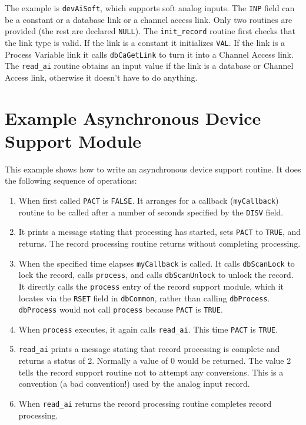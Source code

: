 The example is \verb|devAiSoft|, which supports soft analog inputs.
The \verb|INP| field can be a constant or a database link or a channel access link.
Only two routines are provided (the rest are declared \verb|NULL|).
The \verb|init_record| routine first checks that the link type is valid.
If the link is a constant it initializes \verb|VAL|.
If the link is a Process Variable link it calls \verb|dbCaGetLink| to turn it into a Channel Access link.
The \verb|read_ai| routine obtains an input value if the link is a database 
or Channel Access link, otherwise it doesn't have to do anything.  

\section{Example Asynchronous Device Support Module}

This example shows how to write an asynchronous device support routine.
It does the following sequence of operations:

\begin{enumerate}
\item When first called \verb|PACT| is \verb|FALSE|.
It arranges for a callback (\verb|myCallback|) routine to be called after a number of seconds specified by the \verb|DISV| field.

\item It prints a message stating that processing has started, sets \verb|PACT| to \verb|TRUE|, and returns.
The record processing routine returns without completing processing.

\item When the specified time elapses \verb|myCallback| is called.
It calls \verb|dbScanLock| to lock the record, calls \verb|process|, and calls \verb|dbScanUnlock| to unlock the record.
It directly calls the \verb|process| entry of the record support module, which it locates via the \verb|RSET| field in \verb|dbCommon|, rather than calling \verb|dbProcess|. \verb|dbProcess| would not call \verb|process| because \verb|PACT| is \verb|TRUE|. 

\item When \verb|process| executes, it again calls \verb|read_ai|.
This time \verb|PACT| is \verb|TRUE|.

\item \verb|read_ai| prints a message stating that record processing is complete and returns a status of 2.
Normally a value of  0 would be returned.
The value 2 tells the record support routine not to attempt any conversions.
This is a convention (a bad convention!) used by the analog input record.

\item When \verb|read_ai| returns the record processing routine completes record processing.

\end{enumerate}

